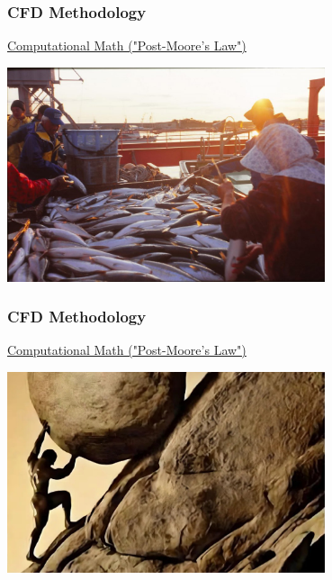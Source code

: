 \documentclass[12pt]{beamer}
\begin{document}
\begin{frame}
    \frametitle{CFD Methodology}
    \underline{Computational Math ("Post-Moore's Law")}

    \includegraphics[width=0.7\textwidth]{img/1-fisher.jpg}
\end{frame}
\begin{frame}
    \frametitle{CFD Methodology}
    \underline{Computational Math ("Post-Moore's Law")}

    \includegraphics[width=0.7\textwidth]{img/2-sisyphus.jpg}
\end{frame}
\end{document}
